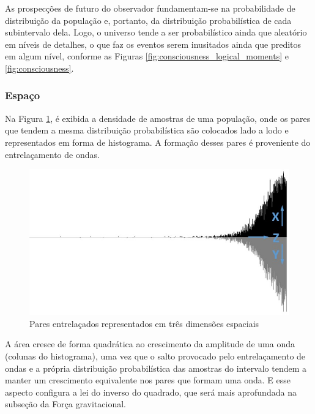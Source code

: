 As prospecções de futuro do observador fundamentam-se na probabilidade de distribuição da população e, portanto, da distribuição probabilística de cada subintervalo dela. Logo, o universo tende a ser probabilístico ainda que aleatório em níveis de detalhes, o que faz os eventos serem inusitados ainda que preditos em algum nível, conforme as Figuras \ref{fig:consciousness_logical_moments} e \ref{fig:consciousness}. 

\subsubsection{Espaço}
Na Figura \ref{fig:consciousness_space_waves}, é exibida a densidade de amostras de uma população, onde os pares que tendem a mesma distribuição probabilística são colocados lado a lodo e representados em forma de histograma. A formação desses pares é proveniente do entrelaçamento de ondas.
	\begin{figure}[H]
	\caption{Pares entrelaçados representados em três dimensões espaciais}
	\label{fig:consciousness_space_waves}
	\centering
	\includegraphics[scale=.7]{sections/images/consciousness_space_waves.jpg}
	\end{figure}

A área cresce de forma quadrática ao crescimento da amplitude de uma onda (colunas do histograma), uma vez que o salto provocado pelo entrelaçamento de ondas e a própria distribuição probabilística das amostras do intervalo tendem a manter um crescimento equivalente nos pares que formam uma onda. E esse aspecto configura a lei do inverso do quadrado, que será mais aprofundada na subseção da Força gravitacional.

